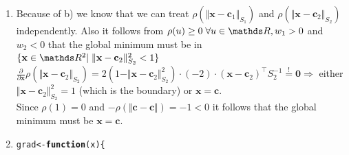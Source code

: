 \documentclass[a4paper]{article}
\makeatletter
\newcommand{\hlstd}[1]{\textcolor[rgb]{0.345,0.345,0.345}{#1}}%
\newcommand{\hlkwa}[1]{\textcolor[rgb]{0.161,0.373,0.58}{\textbf{#1}}}%
\newcommand{\hlkwb}[1]{\textcolor[rgb]{0.69,0.353,0.396}{#1}}%
\newcommand{\hlkwc}[1]{\textcolor[rgb]{0.333,0.667,0.333}{#1}}%
\newenvironment{kframe}{%
 \def\at@end@of@kframe{}%
 \ifinner\ifhmode%
  \def\at@end@of@kframe{\end{minipage}}%
  \begin{minipage}{\columnwidth}%
 \fi\fi%
 \def\FrameCommand##1{\hskip\@totalleftmargin \hskip-\fboxsep
 \colorbox{shadecolor}{##1}\hskip-\fboxsep
     \hskip-\linewidth \hskip-\@totalleftmargin \hskip\columnwidth}%
 \MakeFramed {\advance\hsize-\width
   \@totalleftmargin\z@ \linewidth\hsize
   \@setminipage}}%
 {\par\unskip\endMakeFramed%
 \at@end@of@kframe}
\newenvironment{knitrout}{}{} %
\makeatother
\begin{document}
{\begin{enumerate}
\begin{enumerate}
$\Rightarrow $ Eigenvalues $\mu_1, \mu_2$ of $S_2^{-1}$ are $\mu_i = 1/\lambda_i.$ \\
With this we get \\
$\Vert\mathbf{x} - \mathbf{c}_2\Vert_{S_2}^2 < 1 \iff  (\mathbf{x} - \mathbf{c}_2)^\top \mathbf{V}^\top \begin{pmatrix} 5 & 0 \\ 0 & 0.5\end{pmatrix}\mathbf{V} (\mathbf{x} - \mathbf{c}_2) < 1$ with $\vert\det\mathbf{V}\vert = 1.$ \\
$\Rightarrow$ the circle around $\mathbf{c}_2$ with radius $\sqrt{1/0.5} = \sqrt{2}$ encloses the ellipse. \\
$\Vert\mathbf{c}_2 - \mathbf{c}_1\Vert_2 = \sqrt{2\cdot 1.9^2} \approx 2.69 > 1 + \sqrt{2} \approx 2.41 \Rightarrow$ the circles can not intersect \\
$\Rightarrow$ the unit circle around $\mathbf{c}_1$ and the ellipse around $\mathbf{c}_2$ can not intersect $\Rightarrow$ only $\rho(\Vert\mathbf{x} - \mathbf{c}_1\Vert_{S_1})$ or $\rho(\Vert\mathbf{x} - \mathbf{c}_2\Vert_{S_2})$ can be non-zero for a given $\mathbf{x} \in \R^2.$ \\
\end{enumerate}
\item Because of b) we know that we can treat $\rho(\Vert\mathbf{x} - \mathbf{c}_1\Vert_{S_1})$ and $\rho(\Vert\mathbf{x} - \mathbf{c}_2\Vert_{S_2})$ independently. Also it follows from $\rho(u) \geq 0 \; \forall u \in \R, w_1 > 0$ and $w_2 < 0$ that the global minimum must be in $\{\mathbf{x} \in \R^2 |\; \Vert\mathbf{x} - \mathbf{c}_2\Vert_{S_2}^2 < 1\}$ \\
$\frac{\partial}{\partial \mathbf{x}}\rho(\Vert\mathbf{x} - \mathbf{c}_2\Vert_{S_2}) =  2(1 - \Vert\mathbf{x} - \mathbf{c}_2\Vert_{S_2}^2)\cdot (-2) \cdot (\mathbf{x} - \mathbf{c}_2)^\top S_2^{-1} \overset{!}{=} \mathbf{0} \Rightarrow$ either $\Vert\mathbf{x} - \mathbf{c}_2\Vert_{S_2}^2 = 1$ (which is the boundary) or $\mathbf{x} = \mathbf{c}$. \\
Since $\rho(1) = 0$ and $-\rho(\Vert \mathbf{c} - \mathbf{c} \Vert) = -1 < 0$ it follows that the global minimum must be $\mathbf{x} = \mathbf{c}.$
\item 
\begin{knitrout}
\color{fgcolor}\begin{kframe}
\begin{alltt}
\hlstd{grad} \hlkwb{<-} \hlkwa{function}\hlstd{(}\hlkwc{x}\hlstd{) \{}

\end{alltt}
\end{kframe}
\end{knitrout}
\end{enumerate}}
\end{document}
